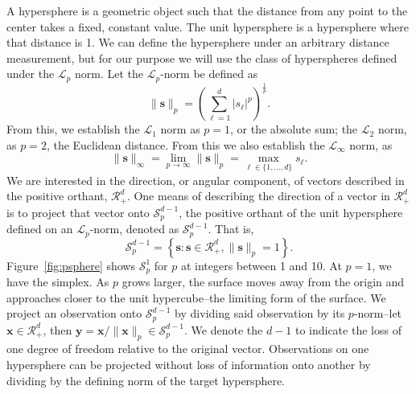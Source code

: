 A hypersphere is a geometric object such that the distance from any point to the center takes a fixed,
  constant value.  The unit hypersphere is a hypersphere where that distance is 1. We can define the
  hypersphere under an arbitrary distance measurement, but for our purpose we will use the class of
  hyperspheres defined under the $\mathcal{L}_p$ norm. Let the $\mathcal{L}_p$-norm be defined as
  \begin{equation*}
    \lVert \bm{s} \rVert_p = \left({\textstyle\sum}_{\ell = 1}^d \lvert s_{\ell}\rvert^p\right)^{\frac{1}{p}}.
  \end{equation*}
  From this, we establish the $\mathcal{L}_1$ norm as $p = 1$, or the absolute sum; the
  $\mathcal{L}_2$ norm, as $p = 2$, the Euclidean distance.  From this we also establish the
  $\mathcal{L}_{\infty}$ norm, as
  \begin{equation*}
    \lVert \bm{s} \rVert_{\infty}
      = \lim\limits_{p\to\infty} \lVert \bm{s} \rVert_p
      = \max_{\ell\in\lbrace1,\ldots,d\rbrace}s_{\ell}.
  \end{equation*}
  We are interested in the direction, or angular component, of vectors described in the positive
  orthant, $\mathcal{R}_{+}^d$.  One means of describing the direction of a vector in $\mathcal{R}_+^d$
  is to project that vector onto $\mathcal{S}_{p}^{d-1}$, the positive orthant of the unit hypersphere
  defined on an $\mathcal{L}_p$-norm, denoted as $\mathcal{S}_{p}^{d-1}$.  That is,
  \begin{equation*}
    \mathcal{S}_{p}^{d-1} = \left\lbrace \bm{s} : \bm{s} \in \mathcal{R}_{+}^{d}, \lVert \bm{s}\rVert_{p} = 1\right\rbrace.
  \end{equation*}
  Figure~\ref{fig:psphere} shows $\mathcal{S}_{p}^{1}$ for $p$ at integers between 1 and 10.
  At $p = 1$, we have the simplex.  As $p$ grows larger, the surface moves away from the origin and
  approaches closer to the unit hypercube--the limiting form of the surface. We project an observation
  onto $\mathcal{S}_p^{d-1}$ by dividing said observation by its $p$-norm--let
  $\bm{x}\in \mathcal{R}_{+}^{d}$, then $\bm{y} = \bm{x} / \lVert \bm{x}\rVert_p \in \mathcal{S}_{p}^{d-1}$.
  We denote the $d-1$ to indicate the loss of one degree of freedom relative to the original vector.
  Observations on one hypersphere can be projected without loss of information onto another by
  dividing by the defining norm of the target hypersphere.

